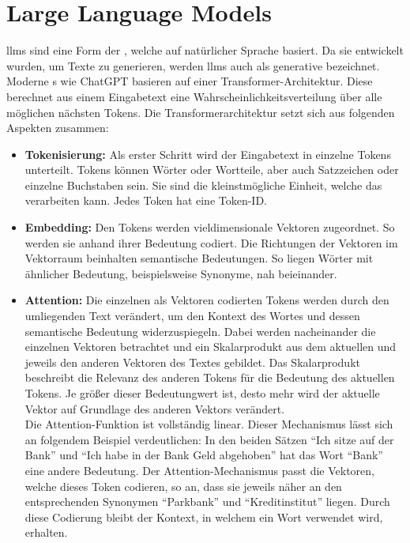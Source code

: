 \documentclass[../main.tex]{subfiles}
\begin{document}
\section{Large Language Models}
\label{sec:llm}

\glspl{llm} sind eine Form der , welche auf natürlicher Sprache basiert. Da sie entwickelt wurden, um Texte zu generieren, werden \glspl{llm} auch als generative  bezeichnet.
Moderne s wie ChatGPT basieren auf einer Transformer-Architektur. Diese berechnet aus einem Eingabetext eine Wahrscheinlichkeitsverteilung 
über alle möglichen nächsten Tokens. Die Transformerarchitektur setzt sich aus folgenden Aspekten zusammen:\cite{architecture}\\

\begin{itemize}

\item \textbf{Tokenisierung:} Als erster Schritt wird der Eingabetext in einzelne Tokens unterteilt. Tokens können Wörter oder Wortteile, aber auch Satzzeichen oder einzelne Buchstaben sein. Sie sind die kleinstmögliche Einheit, welche das  verarbeiten kann. Jedes Token hat eine Token-ID.\cite{architecture}

\item \textbf{Embedding:} Den Tokens werden vieldimensionale Vektoren zugeordnet. So werden sie anhand ihrer Bedeutung codiert. Die Richtungen der Vektoren im Vektorraum beinhalten semantische Bedeutungen. So liegen Wörter mit ähnlicher Bedeutung, beispielsweise Synonyme, nah beieinander.\cite{embedding}

\item \textbf{Attention:} Die einzelnen als Vektoren codierten Tokens werden durch den umliegenden Text verändert, um den Kontext des Wortes und dessen semantische Bedeutung widerzuspiegeln. Dabei werden nacheinander die einzelnen Vektoren betrachtet und ein Skalarprodukt aus dem aktuellen und jeweils den anderen Vektoren des Textes gebildet. Das Skalarprodukt beschreibt die Relevanz des anderen Tokens für die Bedeutung des aktuellen Tokens. Je größer dieser Bedeutungwert ist, desto mehr wird der aktuelle Vektor auf Grundlage des anderen Vektors verändert.\\
Die Attention-Funktion ist vollständig linear. Dieser Mechanismus lässt sich an folgendem Beispiel verdeutlichen: In den beiden Sätzen "`Ich sitze auf der Bank"' und "`Ich habe in der Bank Geld abgehoben"' hat das Wort "`Bank"' eine andere Bedeutung. Der Attention-Mechanismus passt die Vektoren, welche dieses Token codieren, so an, dass sie jeweils näher an den entsprechenden Synonymen "`Parkbank"' und "`Kreditinstitut"' liegen. Durch diese Codierung bleibt der Kontext, in welchem ein Wort verwendet wird, erhalten.\cite{attention, attention2} 


\end{itemize}
\end{document}
